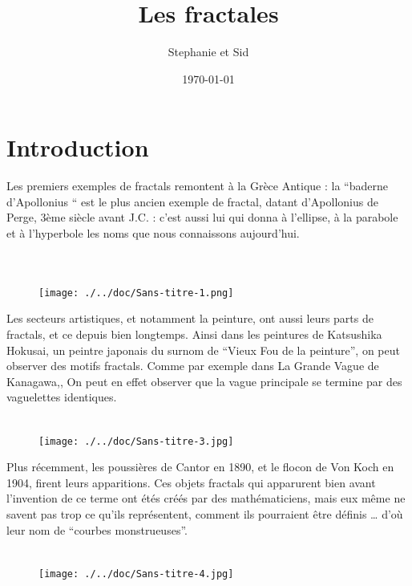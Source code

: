 \documentclass[a4paper]{article}
\title{Les fractales}
\author{Stephanie \bsc{Noel} et Sid \bsc{Berraf}}
\date{\today}
\begin{document}
\maketitle
\newpage
\tableofcontents
\newpage

\section{Introduction}
Les premiers exemples de fractals remontent à la Grèce Antique : la ``baderne d’Apollonius `` est le plus ancien exemple de fractal, datant d’Apollonius de Perge, 3ème siècle avant J.C. : c'est aussi lui qui donna à l'ellipse, à la parabole et à l'hyperbole les noms que nous connaissons aujourd’hui.\\\\\

\begin{figure}[H]
\begin{center}
\texttt{[image: ./../doc/Sans-titre-1.png]}
\end{center}
\end{figure}

Les secteurs artistiques, et notamment la peinture, ont aussi leurs parts de fractals, et ce depuis bien longtemps. Ainsi dans les peintures de Katsushika Hokusai, un peintre japonais du surnom de “Vieux Fou de la peinture”, on peut observer des motifs fractals. Comme par exemple dans La Grande Vague de Kanagawa,, On peut en effet observer que la vague principale se termine par des vaguelettes identiques.\\\\

\begin{figure}[H]
\begin{center}
\texttt{[image: ./../doc/Sans-titre-3.jpg]}
\end{center}
\end{figure}

Plus récemment, les poussières de Cantor en 1890, et  le flocon de Von Koch en 1904, firent leurs apparitions. Ces objets fractals qui apparurent bien avant l’invention de ce terme ont étés créés par des mathématiciens, mais eux même ne savent pas trop ce qu’ils représentent, comment ils pourraient être définis … d’où leur nom de “courbes monstrueuses”.\\\\

\begin{figure}[H]
\begin{center}
\texttt{[image: ./../doc/Sans-titre-4.jpg]}
\end{center}
\end{figure}
\end{document}
